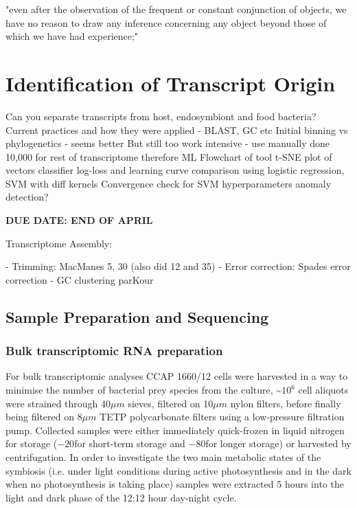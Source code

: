 \graphicspath{{chapters/4.Chapter_2/figures}}

\begin{savequote}[75mm]
"even after the observation of the frequent or constant conjunction of objects, we have no reason to draw any inference concerning any object beyond those of which we have had experience;"
\end{savequote}


\chapter{Identification of Transcript Origin}

Can you separate transcripts from host, endosymbiont and food bacteria?
Current practices and how they were applied - BLAST, GC etc
Initial binning vs phylogenetics - seems better
But still too work intensive - use manually done 10,000 for rest of transcriptome therefore ML
Flowchart of tool 
t-SNE plot of vectors
classifier log-loss and learning curve comparison using logistic regression, SVM with diff kernels
Convergence check for SVM hyperparameters
anomaly detection?

\bf{DUE DATE: END OF APRIL}



Transcriptome Assembly:

- Trimming: MacManes 5, 30 (also did 12 and 35)
- Error correction: Spades error correction
- GC clustering parKour

\section{Sample Preparation and Sequencing}

\subsection{Bulk transcriptomic RNA preparation}
For bulk transcriptomic analyses CCAP 1660/12 cells were harvested in a way to minimise the 
number of bacterial prey species from the culture, \textasciitilde \(10^{6}\) 
cell aliquots were strained through 40\(\mu m\) sieves, filtered on 
10\(\mu m\) nylon filters, 
before finally being filtered on 8\(\mu m\) TETP polycarbonate filters using a 
low-pressure filtration pump.  Collected samples were either immediately 
quick-frozen in liquid nitrogen for storage (\(-20\)\celsius for short-term storage 
and \(-80\)\celsius for longer storage) or harvested by centrifugation.  
In order to investigate the two main metabolic states of the symbiosis 
(i.e. under light conditions during active photosynthesis and in the dark 
when no photosynthesis is taking place) samples were extracted 5 hours into 
the light and dark phase of the 12:12 hour day-night cycle.

